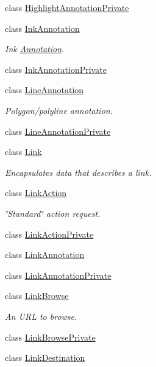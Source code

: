 \begin{DoxyCompactItemize}
class \hyperlink{class_poppler_1_1_highlight_annotation_private}{Highlight\+Annotation\+Private}
\item 
class \hyperlink{class_poppler_1_1_ink_annotation}{Ink\+Annotation}
\begin{DoxyCompactList}\small\item\em Ink \hyperlink{class_poppler_1_1_annotation}{Annotation}. \end{DoxyCompactList}\item 
class \hyperlink{class_poppler_1_1_ink_annotation_private}{Ink\+Annotation\+Private}
\item 
class \hyperlink{class_poppler_1_1_line_annotation}{Line\+Annotation}
\begin{DoxyCompactList}\small\item\em Polygon/polyline annotation. \end{DoxyCompactList}\item 
class \hyperlink{class_poppler_1_1_line_annotation_private}{Line\+Annotation\+Private}
\item 
class \hyperlink{class_poppler_1_1_link}{Link}
\begin{DoxyCompactList}\small\item\em Encapsulates data that describes a link. \end{DoxyCompactList}\item 
class \hyperlink{class_poppler_1_1_link_action}{Link\+Action}
\begin{DoxyCompactList}\small\item\em \char`\"{}\+Standard\char`\"{} action request. \end{DoxyCompactList}\item 
class \hyperlink{class_poppler_1_1_link_action_private}{Link\+Action\+Private}
\item 
class \hyperlink{class_poppler_1_1_link_annotation}{Link\+Annotation}
\item 
class \hyperlink{class_poppler_1_1_link_annotation_private}{Link\+Annotation\+Private}
\item 
class \hyperlink{class_poppler_1_1_link_browse}{Link\+Browse}
\begin{DoxyCompactList}\small\item\em An U\+RL to browse. \end{DoxyCompactList}\item 
class \hyperlink{class_poppler_1_1_link_browse_private}{Link\+Browse\+Private}
\item 
class \hyperlink{class_poppler_1_1_link_destination}{Link\+Destination}

\end{DoxyCompactItemize}
